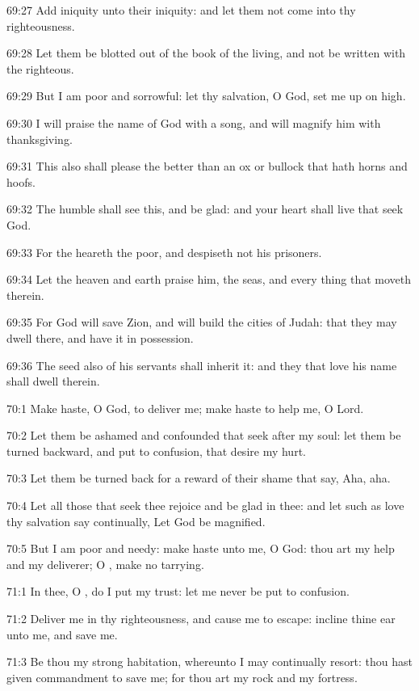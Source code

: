 69:27 Add iniquity unto their iniquity: and let them not come into thy righteousness.

69:28 Let them be blotted out of the book of the living, and not be written with the righteous.

69:29 But I am poor and sorrowful: let thy salvation, O God, set me up on high.

69:30 I will praise the name of God with a song, and will magnify him with thanksgiving.

69:31 This also shall please the \LORD better than an ox or bullock that hath horns and hoofs.

69:32 The humble shall see this, and be glad: and your heart shall live that seek God.

69:33 For the \LORD heareth the poor, and despiseth not his prisoners.

69:34 Let the heaven and earth praise him, the seas, and every thing that moveth therein.

69:35 For God will save Zion, and will build the cities of Judah: that they may dwell there, and have it in possession.

69:36 The seed also of his servants shall inherit it: and they that love his name shall dwell therein.



70:1 Make haste, O God, to deliver me; make haste to help me, O Lord.

70:2 Let them be ashamed and confounded that seek after my soul: let them be turned backward, and put to confusion, that desire my hurt.

70:3 Let them be turned back for a reward of their shame that say, Aha, aha.

70:4 Let all those that seek thee rejoice and be glad in thee: and let such as love thy salvation say continually, Let God be magnified.

70:5 But I am poor and needy: make haste unto me, O God: thou art my help and my deliverer; O \LORD, make no tarrying.



71:1 In thee, O \LORD, do I put my trust: let me never be put to confusion.

71:2 Deliver me in thy righteousness, and cause me to escape: incline thine ear unto me, and save me.

71:3 Be thou my strong habitation, whereunto I may continually resort: thou hast given commandment to save me; for thou art my rock and my fortress.


